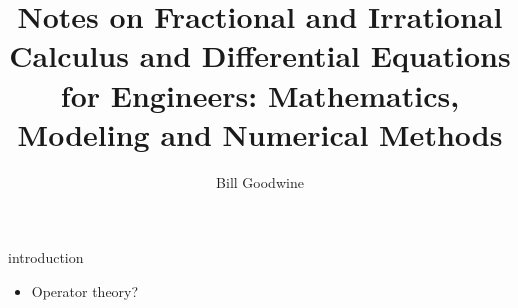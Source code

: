\documentclass{book}
\title{Notes on Fractional and Irrational Calculus and Differential Equations for Engineers: Mathematics, Modeling and Numerical Methods}
\author{Bill Goodwine}
\begin{document}
\maketitle

{introduction}


\begin{itemize}
\item Operator theory?
\end{itemize}
\end{document}
